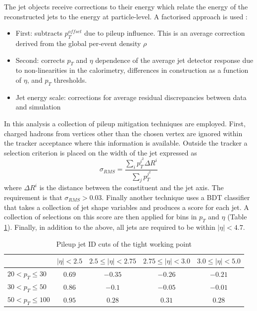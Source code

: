 The jet objects receive corrections to their energy which relate the energy of the reconstructed jets to the energy at particle-level. A factorised approach is used \cite{JetPerformance}:
\begin{itemize}[leftmargin=.5in,noitemsep]
    \item First: subtracts $p_{T}^{offset}$ due to pileup influence. This is an average correction derived from the global per-event density $\rho$
    \item Second: corrects $p_{T}$ and $\eta$ dependence of the average jet detector response due to non-linearities in the calorimetry, differences in construction as a function of $\eta$, and $p_{T}$ thresholds.
    \item Jet energy scale: corrections for average residual discrepancies between data and simulation
\end{itemize}

In this analysis a collection of pileup mitigation techniques are employed. First, charged hadrons from vertices other than the chosen vertex are ignored within the tracker acceptance where this information is available. Outside the tracker a selection criterion is placed on the width of the jet expressed as
\begin{equation}
    \sigma_{RMS} = \frac{\sum_{i}p_{T}^{i^2}\Delta{R}^{i}}{\sum_{j}p_{T}^{j^2}}
\end{equation}
where $\Delta{R}^{i}$ is the distance between the constituent and the jet axis. The requirement is that $\sigma_{RMS} > 0.03$. 
Finally another technique uses a BDT classifier that takes a collection of jet shape variables and produces a score for each jet. A collection of selections on this score are then applied for bins in $p_{T}$ and $\eta$ (Table \ref{tab:object_reco:tight_pujid}).
Finally, in addition to the above, all jets are required to be within $|\eta| < 4.7$.

\begin{table}[h!]
    \begin{tabular}{ l || c | c | c | c }
         & $|\eta| < 2.5$ & $2.5 \leq |\eta| < 2.75$ & $2.75 \leq |\eta| < 3.0$ & $3.0 \leq |\eta| < 5.0$ \\
        \hline
        \hline
        $20 < p_{T} \leq 30$  & $0.69$ & $-0.35$ & $-0.26$ & $-0.21$ \\
        $30 < p_{T} \leq 50$  & $0.86$ & $-0.1$  & $-0.05$ & $-0.01$ \\
        $50 < p_{T} \leq 100$ & $0.95$ & $0.28$  & $0.31$  & $0.28$  \\
\end{tabular}
    \caption{Pileup jet ID cuts of the tight working point}
    \label{tab:object_reco:tight_pujid}
\end{table}





